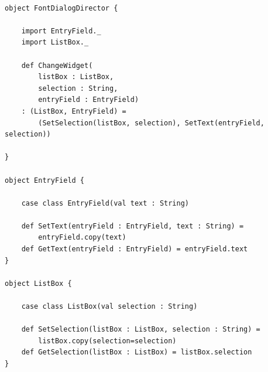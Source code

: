 \begin{lstlisting}[caption={Mediator Funcional},label=fpmediator]
    
object FontDialogDirector {

	import EntryField._
	import ListBox._
	
	def ChangeWidget(
		listBox : ListBox, 
		selection : String, 
		entryField : EntryField) 
	: (ListBox, EntryField) =
		(SetSelection(listBox, selection), SetText(entryField, selection))
	
}
	
object EntryField {
	
	case class EntryField(val text : String)
	
	def SetText(entryField : EntryField, text : String) = 
		entryField.copy(text)
	def GetText(entryField : EntryField) = entryField.text
}
	
object ListBox {
	
	case class ListBox(val selection : String)
		
	def SetSelection(listBox : ListBox, selection : String) = 
		listBox.copy(selection=selection)
	def GetSelection(listBox : ListBox) = listBox.selection
}
	
    
\end{lstlisting}